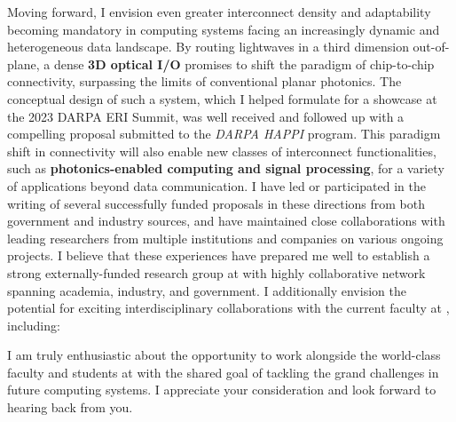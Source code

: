 Moving forward, I envision even greater interconnect density and adaptability becoming mandatory in computing systems facing an increasingly dynamic and heterogeneous data landscape. By routing lightwaves in a third dimension out-of-plane, a dense \textbf{3D optical I/O} promises to shift the paradigm of chip-to-chip connectivity, surpassing the limits of conventional planar photonics. The conceptual design of such a system, which I helped formulate for a showcase at the 2023 DARPA ERI Summit, was well received and followed up with a compelling proposal submitted to the \emph{DARPA HAPPI} program. This paradigm shift in connectivity will also enable new classes of interconnect functionalities, such as \textbf{photonics-enabled computing and signal processing}, for a variety of applications beyond data communication. I have led or participated in the writing of several successfully funded proposals in these directions from both government and industry sources, and have maintained close collaborations with leading researchers from multiple institutions and companies on various ongoing projects. I believe that these experiences have prepared me well to establish a strong externally-funded research group at \appSchoolDeptShort{} with highly collaborative network spanning academia, industry, and government. I additionally envision the potential for exciting interdisciplinary collaborations with the current faculty at \appSchoolShort{}, including:
\begin{enumerate*}[label=(\roman*)]
    \appCollab{}
\end{enumerate*}

I am truly enthusiastic about the opportunity to work alongside the world-class faculty and students at \appSchoolDeptShort{} with the shared goal of tackling the grand challenges in future computing systems. I appreciate your consideration and look forward to hearing back from you.